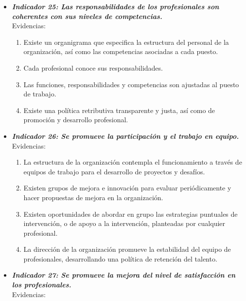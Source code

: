 \begin{itemize}
\begin{itemize}
\begin{itemize}
\begin{enumerate}
			\end{enumerate}
			\item \textbf{\textit{Indicador 25: Las responsabilidades de los profesionales son coherentes con sus niveles de competencias.}}\\Evidencias:
			
			\begin{enumerate}
				\item Existe un organigrama que especifica la estructura del personal de la organización, así como las competencias asociadas a cada puesto. 
				\item Cada profesional conoce sus responsabilidades. 
				\item Las funciones, responsabilidades y competencias son ajustadas al puesto de trabajo. 
				\item Existe una política retributiva transparente y justa, así como de promoción y desarrollo profesional.      
				 
			\end{enumerate}
			\item \textbf{\textit{Indicador 26: Se promueve la participación y el trabajo en equipo.}}\\Evidencias:
			
			\begin{enumerate}
				\item La estructura de la organización contempla el funcionamiento a través de equipos de trabajo para el desarrollo de proyectos y desafíos. 
				\item Existen grupos de mejora e innovación para evaluar periódicamente y hacer propuestas de mejora en la organización. 
				\item Existen oportunidades de abordar en grupo las estrategias puntuales de intervención, o de apoyo a la intervención, planteadas por cualquier profesional. 
				\item La dirección de la organización promueve la estabilidad del equipo de profesionales, desarrollando una política de retención del talento. 
				 
			\end{enumerate}

			\item \textbf{\textit{Indicador 27: Se promueve la mejora del nivel de satisfacción en los profesionales.}}\\Evidencias:
			

\end{itemize}
\end{itemize}
\end{itemize}
